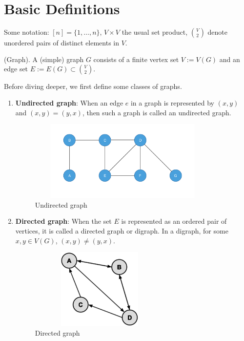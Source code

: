\documentclass[../basic_graph_theory.tex]{subfiles}
\begin{document}
\chapter{Basic Definitions}
\setcounter{chapter}{1} %
\setcounter{section}{1}
\setcounter{equation}{1}
\setcounter{figure}{1}

Some notation: $[n] = \{1,\ldots,n\}$, $V \times V$ the usual set product, $\binom{V}{2}$ denote unordered pairs of distinct elements in $V$.
%
\begin{defn}(Graph).
    A (simple) graph $G$ consists of a finite vertex set $V := V(G)$ and an edge set $E := E(G) \subset \binom{V}{2}.$
\end{defn}
Before diving deeper, we first define some classes of graphs.
\begin{enumerate}
    \item \textbf{Undirected graph}: When an edge $e$ in a graph is represented by $(x,y)$ and $(x,y)=(y,x)$, then such a graph is called an undirected graph.
          \begin{figure}[hbt!]
              \centering
              \includegraphics[height=4cm, width=9.5cm]{../images/undirected.png}
              \caption{Undirected graph}
          \end{figure}
    \item \textbf{Directed graph}: When the set $E$ is represented as an ordered pair of vertices, it is called a directed graph or digraph. In a digraph, for some $x,y \in V(G)$, $(x,y) \neq (y,x)$.
          \begin{figure}[hbt!]
              \centering
              \includegraphics[height=4cm, width=7cm]{../images/directed.png}
              \caption{Directed graph}

\end{figure}
\end{enumerate}
\end{document}
